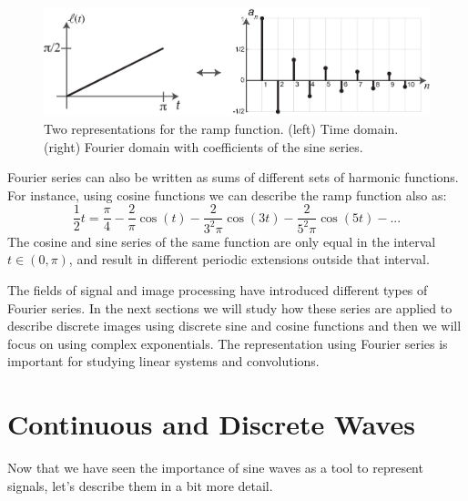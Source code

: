 \begin{figure}[t]
	\centerline{
		\includegraphics[width=.9\linewidth]{figures/Image_processing_fourier/FourierSeries5_representation.eps}
	}
	\caption{Two representations for the ramp
		function. (left) Time domain. (right) Fourier domain with coefficients of the sine series.%
	}
	\label{fig:FourierSeries5_representation}
\end{figure}

Fourier series can also be written as sums of different sets of harmonic functions. For instance, using cosine functions we can describe the ramp function also as:
\begin{equation}
	\frac{1}{2} t =  \frac{\pi}{4}  - \frac{2}{\pi} \cos (t) - \frac{2}{3^2 \pi}  \cos (3t) - \frac{2}{5^2 \pi}  \cos (5t) - ...
\end{equation}
The cosine and sine series of the same function are only equal in the interval $t \in (0, \pi)$, and result in different periodic extensions outside that interval.

The fields of signal and image processing have introduced different types of Fourier series. In the next sections we will study how these series are applied to describe discrete images using discrete sine and cosine functions and then we will focus on using complex exponentials. The representation using Fourier series is important for studying linear systems and convolutions.

\section{Continuous and Discrete Waves}

Now that we have seen the importance of sine waves as a tool to represent signals, let's describe them in a bit more detail.


